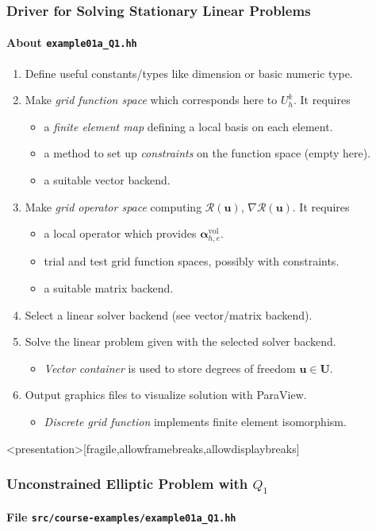 \begin{frame}
\frametitle{Driver for Solving Stationary Linear Problems}
\framesubtitle{About \lstinline{example01a_Q1.hh}}
\begin{enumerate}
\item Define useful constants/types like dimension or basic numeric type.
\item Make \textit{grid function space} which corresponds here to $U_h^k$. It requires
\begin{itemize}
\item a \textit{finite element map} defining a local basis on each element.
\item a method to set up \textit{constraints} on the function space (empty here).
\item a suitable vector backend.
\end{itemize}
\item Make \textit{grid operator space} computing $\mathcal{R}(\mathbf{u})$, $\nabla\mathcal{R}(\mathbf{u})$. It requires
\begin{itemize}
\item a local operator which provides $\bm{\alpha}_{h,e}^{\text{vol}}$.
\item trial and test grid function spaces, possibly with constraints.
\item a suitable matrix backend.
\end{itemize}
\item Select a linear solver backend (see vector/matrix backend).
\item Solve the linear problem given with the selected solver backend.
\begin{itemize}
\item \textit{Vector container} is used to store degrees of freedom $\mathbf{u}\in\mathbf{U}$.
\end{itemize}
\item Output graphics files to visualize solution with ParaView.
\begin{itemize}
\item \textit{Discrete grid function} implements finite element isomorphism.
\end{itemize}
\end{enumerate}
\end{frame}


\begin{frame}<presentation>[fragile,allowframebreaks,allowdisplaybreaks]
\frametitle<presentation>{Unconstrained Elliptic Problem with $Q_1$}
\framesubtitle<presentation>{File \texttt{src/course-examples/example01a\_Q1.hh}}

\end{frame}


